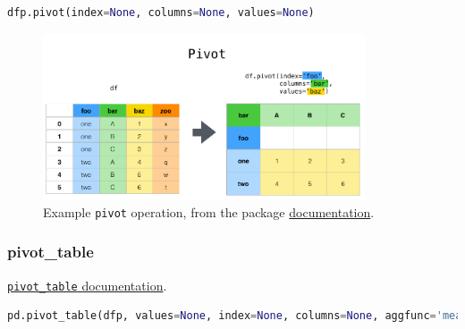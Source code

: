 \begin{lstlisting}[language=Python]
dfp.pivot(index=None, columns=None, values=None)
\end{lstlisting}

\begin{figure}[H]
\centering
\includegraphics[width=0.85\textwidth]{figures/pandas/reshaping_pivot.png}
\caption{
Example \pandas \texttt{pivot} operation, from the package \href{http://pandas.pydata.org/pandas-docs/stable/user_guide/reshaping.html}{documentation}.
}
\label{fig:pandas:pivot}
\end{figure}

\subsubsection{pivot\_table}
\label{pandas:pivoting:pivot_table}

\noindent \href{https://pandas.pydata.org/pandas-docs/stable/reference/api/pandas.pivot_table.html}{\texttt{pivot\_table} documentation}.

\begin{lstlisting}[language=Python]
pd.pivot_table(dfp, values=None, index=None, columns=None, aggfunc='mean', fill_value=None, margins=False, dropna=True, margins_name='All')
\end{lstlisting}

